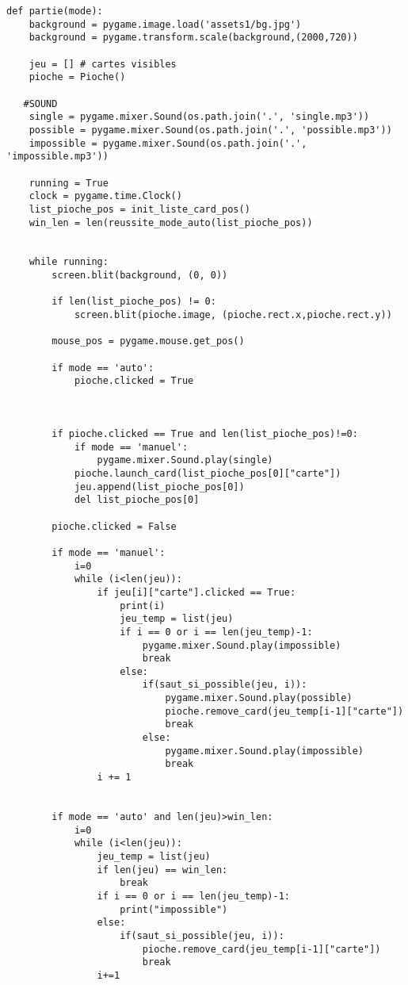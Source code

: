 	\begin{lstlisting}
def partie(mode):
    background = pygame.image.load('assets1/bg.jpg')
    background = pygame.transform.scale(background,(2000,720))

    jeu = [] # cartes visibles 
    pioche = Pioche() 

   #SOUND 
    single = pygame.mixer.Sound(os.path.join('.', 'single.mp3'))
    possible = pygame.mixer.Sound(os.path.join('.', 'possible.mp3'))
    impossible = pygame.mixer.Sound(os.path.join('.', 'impossible.mp3'))

    running = True
    clock = pygame.time.Clock()
    list_pioche_pos = init_liste_card_pos()
    win_len = len(reussite_mode_auto(list_pioche_pos))


    while running:
        screen.blit(background, (0, 0))

        if len(list_pioche_pos) != 0:
            screen.blit(pioche.image, (pioche.rect.x,pioche.rect.y))

        mouse_pos = pygame.mouse.get_pos()

        if mode == 'auto':
            pioche.clicked = True


        
        if pioche.clicked == True and len(list_pioche_pos)!=0:
            if mode == 'manuel':
                pygame.mixer.Sound.play(single)
            pioche.launch_card(list_pioche_pos[0]["carte"])
            jeu.append(list_pioche_pos[0])
            del list_pioche_pos[0]
        
        pioche.clicked = False

        if mode == 'manuel':
            i=0
            while (i<len(jeu)):
                if jeu[i]["carte"].clicked == True:
                    print(i)
                    jeu_temp = list(jeu)
                    if i == 0 or i == len(jeu_temp)-1:
                        pygame.mixer.Sound.play(impossible)
                        break
                    else:
                        if(saut_si_possible(jeu, i)):
                            pygame.mixer.Sound.play(possible)
                            pioche.remove_card(jeu_temp[i-1]["carte"])
                            break
                        else:
                            pygame.mixer.Sound.play(impossible)
                            break
                i += 1


        if mode == 'auto' and len(jeu)>win_len:
            i=0
            while (i<len(jeu)):
                jeu_temp = list(jeu)
                if len(jeu) == win_len:
                    break
                if i == 0 or i == len(jeu_temp)-1:
                    print("impossible")
                else:
                    if(saut_si_possible(jeu, i)):
                        pioche.remove_card(jeu_temp[i-1]["carte"])
                        break
                i+=1


\end{lstlisting}

